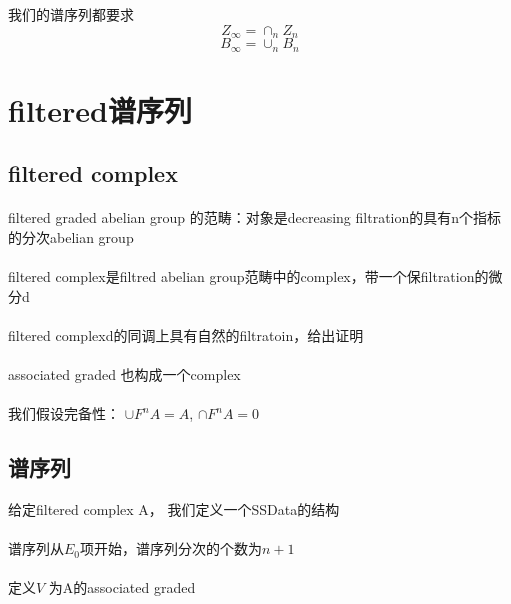 \documentclass[12pt]{article}
\begin{document}
\sffamily
\huge

我们的谱序列都要求
$$Z_\infty = \cap_n Z_n$$
$$B_\infty = \cup_n B_n$$


\section{filtered谱序列}
\subsection{filtered complex}
\paragraph{}filtered graded abelian group 的范畴：对象是decreasing filtration的具有n个指标的分次abelian group

\paragraph{}filtered complex是filtred abelian group范畴中的complex，带一个保filtration的微分d

\paragraph{} filtered complexd的同调上具有自然的filtratoin，给出证明

\paragraph{}associated graded 也构成一个complex

\paragraph{}我们假设完备性： $\cup F^nA =A$, $\cap F^nA=0$

\subsection{谱序列}
给定filtered complex A，
我们定义一个SSData的结构
\paragraph{}谱序列从$E_0$项开始，谱序列分次的个数为$n+1$

\paragraph{}定义$V$ 为A的associated graded
\end{document}
